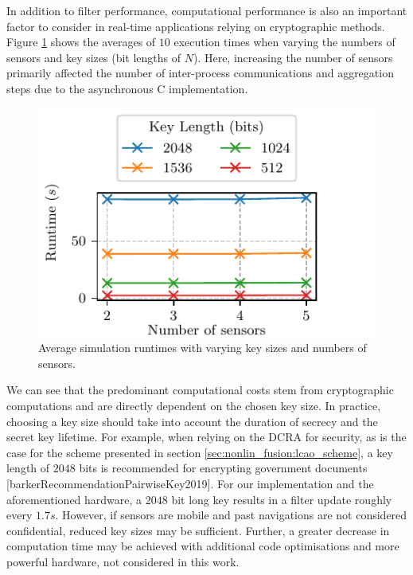 In addition to filter performance, computational performance is also an important factor to consider in real-time applications relying on cryptographic methods. Figure \ref{fig:nonlin_fusion:simulation_timing} shows the averages of $10$ execution times when varying the numbers of sensors and key sizes (bit lengths of $N$). Here, increasing the number of sensors primarily affected the number of inter-process communications and aggregation steps due to the asynchronous C implementation.
\begin{figure}[htbp]
    \centering
    \includegraphics{figures/timing.pdf}
    \caption{Average simulation runtimes with varying key sizes and numbers of sensors.}
    \label{fig:nonlin_fusion:simulation_timing}
\end{figure}
We can see that the predominant computational costs stem from cryptographic computations and are directly dependent on the chosen key size. In practice, choosing a key size should take into account the duration of secrecy and the secret key lifetime. For example, when relying on the DCRA for security, as is the case for the scheme presented in section \ref{sec:nonlin_fusion:lcao_scheme}, a key length of $2048$ bits is recommended for encrypting government documents [barkerRecommendationPairwiseKey2019]. For our implementation and the aforementioned hardware, a $2048$ bit long key results in a filter update roughly every $1.7s$. However, if sensors are mobile and past navigations are not considered confidential, reduced key sizes may be sufficient. Further, a greater decrease in computation time may be achieved with additional code optimisations and more powerful hardware, not considered in this work.

% 
%                                               
%                                               
%                                               
% 

